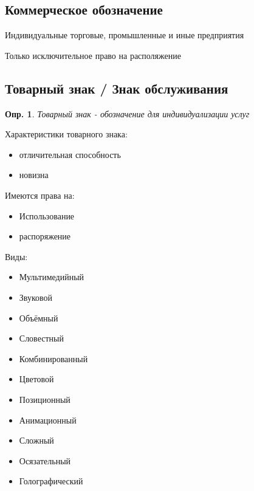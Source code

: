 \documentclass[12pt]{article}
\newtheorem{definition}{Опр.}
\begin{document}
\subsection{Коммерческое обозначение}

Индивидуальные торговые, промышленные и иные предприятия

Только исключительное право на располяжение

\subsection{Товарный знак / Знак обслуживания}

\begin{definition}
  Товарный знак - обозначение для индивидуализации услуг
\end{definition}

Характеристики товарного знака:
\begin{itemize}
  \item отличительная способность
  \item новизна
\end{itemize}

Имеются права на:
\begin{itemize}
  \item Использование
  \item распоряжение
\end{itemize}

Виды:
\begin{itemize}
  \item Мультимедийный
  \item Звуковой
  \item Объёмный
  \item Словестный
  \item Комбинированный
  \item Цветовой
  \item Позиционный
  \item Анимационный
  \item Сложный
  \item Осязательный
  \item Голографический
\end{itemize}
\end{document}
